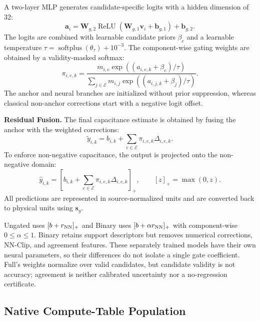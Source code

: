 \documentclass[conference,9pt,letterpaper]{IEEEtran}
\begin{document}
A two-layer MLP generates candidate-specific
logits with a hidden dimension of 32:
\begin{equation}
\mathbf{a}_i
=
\mathbf{W}_{g,2}
\operatorname{ReLU}
(\mathbf{W}_{g,1}\mathbf{v}_i+\mathbf{b}_{g,1})
+\mathbf{b}_{g,2}.
\label{eq:gating_logits}
\end{equation}
The logits are combined with learnable candidate
priors $\beta_e$ and a learnable temperature
$\tau=\operatorname{softplus}(\theta_\tau)+10^{-3}$.
The component-wise gating weights are obtained by
a validity-masked softmax:
\begin{equation}
\pi_{i,e,k}
=
\frac{
m_{i,e}\exp((a_{i,e,k}+\beta_e)/\tau)
}{
\sum_{j\in\mathcal{E}}
m_{i,j}\exp((a_{i,j,k}+\beta_j)/\tau)
}.
\label{eq:gating_weights}
\end{equation}
The anchor and neural branches are initialized
without prior suppression, whereas classical
non-anchor corrections start with a negative
logit offset.

\textbf{Residual Fusion.}
The final capacitance estimate is obtained by
fusing the anchor with the weighted corrections:
\begin{equation}
\widetilde{y}_{i,k}
=
b_{i,k}
+
\sum_{e\in\mathcal{E}}
\pi_{i,e,k}\Delta_{i,e,k}.
\end{equation}
To enforce non-negative capacitance, the output
is projected onto the non-negative domain:
\begin{equation}
\widehat{y}_{i,k}
=
\left[
b_{i,k}
+
\sum_{e\in\mathcal{E}}
\pi_{i,e,k}\Delta_{i,e,k}
\right]_{+},
\qquad
[z]_{+}=\max(0,z).
\label{eq:final_prediction}
\end{equation}
All predictions are represented in source-normalized
units and are converted back to physical units
using $\mathbf{s}_y$.

Ungated uses $[b+r_{\rm NN}]_+$ and Binary uses
$[b+\alpha r_{\rm NN}]_+$ with component-wise $0\leq\alpha\leq1$.
Binary retains support descriptors but removes numerical corrections,
NN-Clip, and agreement features. These separately trained models have their
own neural parameters, so their differences do not isolate a single gate
coefficient. Full's weights normalize over valid candidates, but candidate
validity is not accuracy; agreement is neither calibrated uncertainty nor
a no-regression certificate.

\subsection{Native Compute-Table Population}
\end{document}
